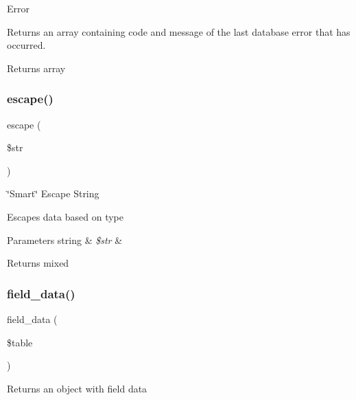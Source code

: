 Error

Returns an array containing code and message of the last database error that has occurred.

\begin{DoxyReturn}{Returns}
array 
\end{DoxyReturn}
\mbox{\label{class_c_i___d_b__postgre__driver_ac8f37ca5703d4558c732e692194f8cd6}} 
\subsubsection{\texorpdfstring{escape()}{escape()}}
{\footnotesize\ttfamily escape (\begin{DoxyParamCaption}\item[{}]{\$str }\end{DoxyParamCaption})}

\char`\"{}\+Smart\char`\"{} Escape String

Escapes data based on type


\begin{DoxyParams}[1]{Parameters}
string & {\em \$str} & \\
\hline
\end{DoxyParams}
\begin{DoxyReturn}{Returns}
mixed 
\end{DoxyReturn}
\mbox{\label{class_c_i___d_b__postgre__driver_a90355121e1ed009e0efdbd544ab56efa}} 
\subsubsection{\texorpdfstring{field\+\_\+data()}{field\_data()}}
{\footnotesize\ttfamily field\+\_\+data (\begin{DoxyParamCaption}\item[{}]{\$table }\end{DoxyParamCaption})}

Returns an object with field data


